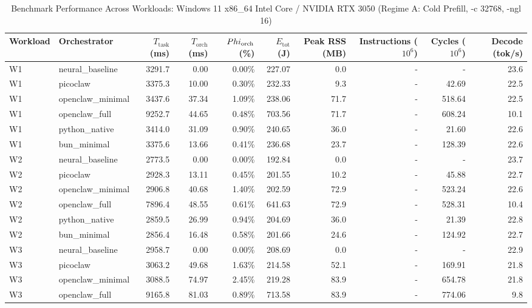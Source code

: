 \begin{table}[t]
\centering\small
\caption{Benchmark Performance Across Workloads: Windows 11 x86_64 Intel Core / NVIDIA RTX 3050 (Regime A: Cold Prefill, -c 32768, -ngl 16)}
\label{tab:Windows_master_summary}
\begin{tabular}{llrrrrrrrr}
\toprule
Workload & Orchestrator & $T_{\text{task}}$ (ms) & $T_{\text{orch}}$ (ms) & $\\Phi_{\text{orch}}$ (\%) & $E_{\text{tot}}$ (J) & Peak RSS (MB) & Instructions ($10^6$) & Cycles ($10^6$) & Decode (tok/s) \\
\midrule
W1 & neural\_baseline & 3291.7 & 0.00 & 0.00\% & 227.07 & 0.0 & - & - & 23.6 \\
W1 & picoclaw & 3375.3 & 10.00 & 0.30\% & 232.33 & 9.3 & - & 42.69 & 22.5 \\
W1 & openclaw\_minimal & 3437.6 & 37.34 & 1.09\% & 238.06 & 71.7 & - & 518.64 & 22.5 \\
W1 & openclaw\_full & 9252.7 & 44.65 & 0.48\% & 703.56 & 71.7 & - & 608.24 & 10.1 \\
W1 & python\_native & 3414.0 & 31.09 & 0.90\% & 240.65 & 36.0 & - & 21.60 & 22.6 \\
W1 & bun\_minimal & 3375.6 & 13.66 & 0.41\% & 236.68 & 23.7 & - & 128.39 & 22.6 \\
\midrule
W2 & neural\_baseline & 2773.5 & 0.00 & 0.00\% & 192.84 & 0.0 & - & - & 23.7 \\
W2 & picoclaw & 2928.3 & 13.11 & 0.45\% & 201.55 & 10.2 & - & 45.88 & 22.7 \\
W2 & openclaw\_minimal & 2906.8 & 40.68 & 1.40\% & 202.59 & 72.9 & - & 523.24 & 22.6 \\
W2 & openclaw\_full & 7896.4 & 48.55 & 0.61\% & 641.63 & 72.9 & - & 528.31 & 10.4 \\
W2 & python\_native & 2859.5 & 26.99 & 0.94\% & 204.69 & 36.0 & - & 21.39 & 22.8 \\
W2 & bun\_minimal & 2856.4 & 16.48 & 0.58\% & 201.66 & 24.6 & - & 124.92 & 22.7 \\
\midrule
W3 & neural\_baseline & 2958.7 & 0.00 & 0.00\% & 208.69 & 0.0 & - & - & 22.9 \\
W3 & picoclaw & 3063.2 & 49.68 & 1.63\% & 214.58 & 52.1 & - & 169.91 & 21.8 \\
W3 & openclaw\_minimal & 3088.5 & 74.97 & 2.45\% & 219.28 & 83.9 & - & 654.78 & 21.8 \\
W3 & openclaw\_full & 9165.8 & 81.03 & 0.89\% & 713.58 & 83.9 & - & 774.06 & 9.8 \\

\end{tabular}
\end{table}
